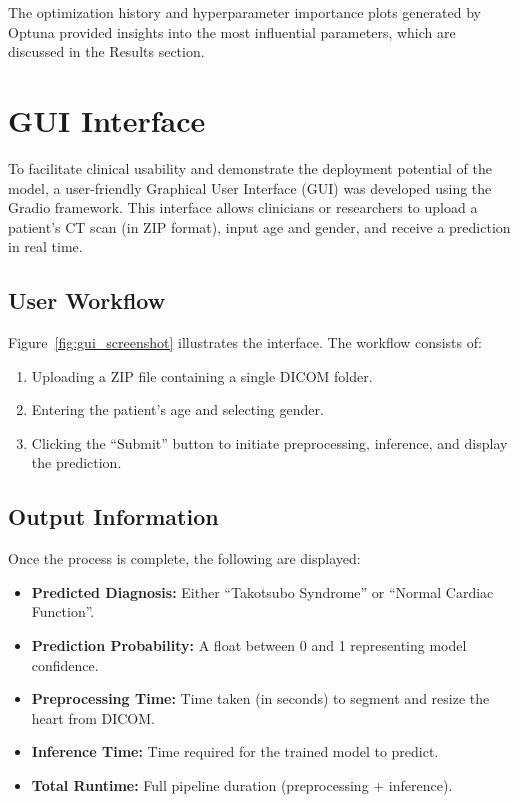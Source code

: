\documentclass[12pt, BSc]{muthesis}
\begin{document}
The optimization history and hyperparameter importance plots generated by Optuna provided insights into the most influential parameters, which are discussed in the Results section.

\section{GUI Interface}

To facilitate clinical usability and demonstrate the deployment potential of the model, a user-friendly Graphical User Interface (GUI) was developed using the Gradio framework. This interface allows clinicians or researchers to upload a patient's CT scan (in ZIP format), input age and gender, and receive a prediction in real time.

\subsection{User Workflow}

Figure~\ref{fig:gui_screenshot} illustrates the interface. The workflow consists of:

\begin{enumerate}
    \item Uploading a ZIP file containing a single DICOM folder.
    \item Entering the patient's age and selecting gender.
    \item Clicking the ``Submit'' button to initiate preprocessing, inference, and display the prediction.
\end{enumerate}

\subsection{Output Information}

Once the process is complete, the following are displayed:

\begin{itemize}
    \item \textbf{Predicted Diagnosis:} Either ``Takotsubo Syndrome'' or ``Normal Cardiac Function''.
    \item \textbf{Prediction Probability:} A float between 0 and 1 representing model confidence.
    \item \textbf{Preprocessing Time:} Time taken (in seconds) to segment and resize the heart from DICOM.
    \item \textbf{Inference Time:} Time required for the trained model to predict.
    \item \textbf{Total Runtime:} Full pipeline duration (preprocessing + inference).
\end{itemize}
\end{document}
